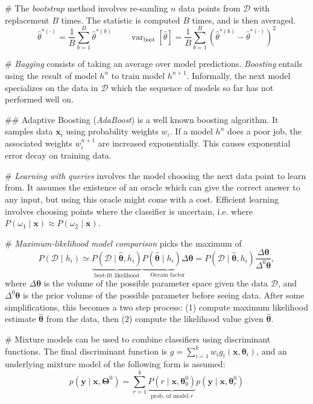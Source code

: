 \documentclass[12pt, a4paper]{article}
\newcommand{\D}{\mathcal{D}}
\newcommand{\vect}[1]{\bm{#1}}
\DeclareMathOperator{\var}{\operatorname{var}}
\begin{document}
\begin{easylist}[itemize]
# The \emph{bootstrap} method involves re-samling $n$ data points from $\D$ with replacement $B$ times.
The statistic is computed $B$ times, and is then averaged.
\begin{equation*}
	\hat{\theta}^{*(\cdot)} = \frac{1}{B} \sum_{b=1}^{B} \hat{\theta}^{*(b)}
	\qquad 
	\var_{\text{boot}} [ \hat{\theta} ]
	=
	\frac{1}{B} \sum_{b=1}^{B}
	\left( \hat{\theta}^{*(b)} - \hat{\theta}^{*(\cdot)} \right)^2 
\end{equation*}


# \emph{Bagging} consists of taking an average over model predictions.
\emph{Boosting} entails using the result of model $h^{n}$ to train model $h^{n+1}$.
Informally, the next model specializes on the data in $\D$ which the sequence of models so far has not performed well on.

## Adaptive Boosting (\emph{AdaBoost}) is a well known boosting algorithm.
It samples data $\vect{x}_i$ using probability weights $w_i$.
If a model $h^n$ does a poor job, the associated weights $w_i^{n+1}$ are increased exponentially. 
This causes exponential error decay on training data.

# \emph{Learning with queries} involves the model choosing the next data point to learn from.
It assumes the existence of an oracle which can give the correct answer to any input, but using this oracle might come with a cost.
Efficient learning involves choosing points where the classifier is uncertain, i.e. where $P(\omega_1 \mid \vect{x}) \approx P(\omega_2 \mid \vect{x})$.

# \emph{Maximum-likelihood model comparison} picks the maximum of
\begin{equation*}
	P(\D \mid h_i ) \simeq 
	\underbrace{P(\D \mid \hat{\vect{\theta}}, h_i)}_{\text{best-fit likelihood}}
	\underbrace{P(\hat{\vect{\theta}} \mid h_i) \Delta \vect{\theta}}_{\text{Occam factor}}
	= 
	P(\D \mid \hat{\vect{\theta}}, h_i)
	\frac{\Delta \vect{\theta}}{\Delta^0 \vect{\theta}},
\end{equation*}
where $\Delta \vect{\theta}$ is the volume of the possible parameter space given the data $\D$, and $\Delta^0 \vect{\theta}$ is the prior volume of the possible parameter before seeing data.
After some simplifications, this becomes a two step process: (1) compute maximum likelihood estimate $\hat{\vect{\theta}}$ from the data, then (2) compute the likelihood value given $\hat{\vect{\theta}}$.

# Mixture models can be used to combine classifiers using discriminant functions.
The final discriminant function is $g = \sum_{i=1}^{k} w_i g_i(\vect{x}, \vect{\theta}_i)$, and an underlying mixture model of the following form is assumed:
\begin{equation*}
	p(\vect{y} \mid \vect{x}, \vect{\Theta}^0)
	= \sum_{r=1}^{k}
	\underbrace{P(r \mid \vect{x}, \vect{\theta}_0^0 )}_{\text{prob. of model }r}
	p(\vect{y} \mid \vect{x}, \vect{\theta}_r^0 )
\end{equation*}





\end{easylist}
\end{document}
